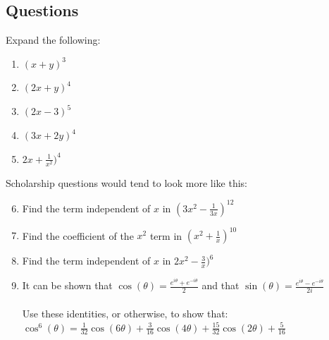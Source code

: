 \documentclass[../main.tex]{subfiles}
\begin{document}
\pagebreak

\subsection*{Questions}
\label{Binomial Expansion}
Expand the following:

\begin{enumerate}
    \item \( (x+y)^3 \)
    \item \( (2x+y)^4 \)
    \item \( (2x-3)^5 \)
    \item \( (3x+2y)^4 \)
    \item \( 2x + \frac{1}{x^2 } )^4 \)
\end{enumerate}

Scholarship questions would tend to look more like this:

\begin{enumerate}
    \setcounter{enumi}{5}
    \item Find the term independent of \( x \) in \( (3x^2 - \frac{1}{3x})^{12}  \)
    \item Find the coefficient of the \( x^2 \) term in \( (x^2 + \frac{1}{x})^{10} \)
    \item Find the term independent of \( x \) in \( 2x^2 - \frac{3}{x})^6 \)
    \item It can be shown that \( \cos(\theta) = \frac{e^{i\theta}+e^{-i\theta}}{2}\) and that \( \sin(\theta) = \frac{e^{i\theta}-e^{-i\theta}}{2i}\)\\ \\
    Use these identities, or otherwise, to show that:\\
    \( \cos^6(\theta) = \frac{1}{32}\cos(6\theta) + \frac{3}{16}\cos(4\theta)+\frac{15}{32}\cos(2\theta)+\frac{5}{16}\)
\end{enumerate}

\pagebreak
\end{document}

